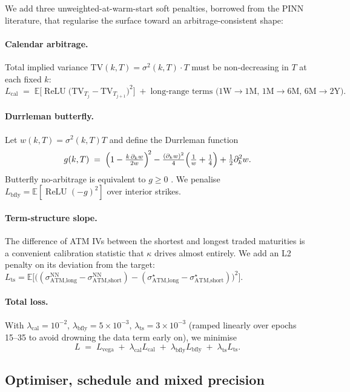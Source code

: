 \documentclass[11pt,a4paper]{article}
\newcommand{\E}{\mathbb{E}}
\DeclareMathOperator{\relu}{ReLU}
\begin{document}
We add three unweighted-at-warm-start soft penalties, borrowed from the
PINN literature, that regularise the surface toward an
arbitrage-consistent shape:

\paragraph{Calendar arbitrage.}
Total implied variance $\mathrm{TV}(k,T)=\sigma^2(k,T)\cdot T$ must be
non-decreasing in $T$ at each fixed $k$:
\[
  L_{\text{cal}} \;=\; \E\bigl[\relu\!\bigl(\mathrm{TV}_{T_j} - \mathrm{TV}_{T_{j+1}}\bigr)^2\bigr]
      \;+\;\text{long-range terms (1W$\to$1M, 1M$\to$6M, 6M$\to$2Y)}.
\]

\paragraph{Durrleman butterfly.}
Let $w(k,T)=\sigma^2(k,T)T$ and define the Durrleman function
\[
  g(k,T) \;=\;
  \Bigl(1 - \tfrac{k\,\partial_k w}{2w}\Bigr)^{\!2}
  - \tfrac{(\partial_k w)^2}{4}\Bigl(\tfrac{1}{w}+\tfrac{1}{4}\Bigr)
  + \tfrac{1}{2}\partial^2_k w.
\]
Butterfly no-arbitrage is equivalent to $g\ge 0$ \cite{durrleman2002}.
We penalise
\(
  L_{\text{bfly}} = \E[\relu(-g)^2]
\)
over interior strikes.

\paragraph{Term-structure slope.}
The difference of ATM IVs between the shortest and longest traded
maturities is a convenient calibration statistic that $\kappa$ drives
almost entirely. We add an L2 penalty on its deviation from the target:
\(
  L_{\text{ts}} =
  \E\!\bigl[\bigl((\sigma_{\text{ATM,long}}^{\text{NN}} -
  \sigma_{\text{ATM,short}}^{\text{NN}}) -
  (\sigma_{\text{ATM,long}}^{\star} -
  \sigma_{\text{ATM,short}}^{\star})\bigr)^2\bigr].
\)

\paragraph{Total loss.}
With $\lambda_{\text{cal}}=10^{-2}$,
$\lambda_{\text{bfly}}=5\times10^{-3}$,
$\lambda_{\text{ts}}=3\times10^{-3}$ (ramped linearly over epochs
15--35 to avoid drowning the data term early on), we minimise
\[
  L \;=\; L_{\text{vega}}
       \;+\;\lambda_{\text{cal}}L_{\text{cal}}
       \;+\;\lambda_{\text{bfly}}L_{\text{bfly}}
       \;+\;\lambda_{\text{ts}}L_{\text{ts}}.
\]

\subsection{Optimiser, schedule and mixed precision}
\end{document}

